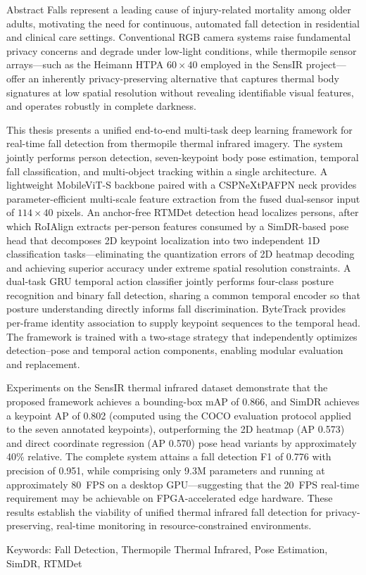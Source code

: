 \vspace*{0pt plus 1fill}
\begin{tucsimplesection}{Abstract}
Falls represent a leading cause of injury-related mortality among older adults, motivating the
need for continuous, automated fall detection in residential and clinical care settings.
Conventional RGB camera systems raise fundamental privacy concerns and degrade under low-light
conditions, while thermopile sensor arrays---such as the Heimann HTPA $60\times40$ employed in
the SensIR project---offer an inherently privacy-preserving alternative that captures thermal
body signatures at low spatial resolution without revealing identifiable visual features, and
operates robustly in complete darkness.

This thesis presents a unified end-to-end multi-task deep learning
framework for real-time fall detection from thermopile thermal infrared imagery. The system
jointly performs person detection, seven-keypoint body pose estimation, temporal fall
classification, and multi-object tracking within a single architecture. A lightweight
MobileViT-S backbone paired with a CSPNeXtPAFPN neck provides
parameter-efficient multi-scale feature extraction from the fused dual-sensor input of
$114\times40$ pixels. An anchor-free RTMDet detection head localizes
persons, after which RoIAlign extracts per-person features consumed by a
SimDR-based pose head that decomposes 2D keypoint localization into two independent 1D
classification tasks---eliminating the quantization errors of 2D heatmap decoding and achieving
superior accuracy under extreme spatial resolution constraints. A dual-task GRU temporal
action classifier jointly performs four-class posture recognition and binary fall detection,
sharing a common temporal encoder so that posture understanding directly informs fall
discrimination. ByteTrack provides per-frame identity association to supply
keypoint sequences to the temporal head. The framework is trained with a two-stage
strategy that independently optimizes detection--pose and temporal action components, enabling
modular evaluation and replacement.

Experiments on the SensIR thermal infrared dataset demonstrate that the proposed framework
achieves a bounding-box mAP of 0.866, and SimDR achieves a keypoint
AP of 0.802 (computed using the COCO evaluation protocol applied to the seven annotated
keypoints), outperforming the 2D heatmap (AP 0.573) and direct coordinate regression (AP 0.570) pose head variants by
approximately 40\% relative. The complete system attains a fall detection F1 of 0.776 with precision of 0.951,
while comprising only 9.3M parameters and running at approximately 80~FPS on a
desktop GPU---suggesting that the 20~FPS real-time requirement may be achievable on FPGA-accelerated edge hardware. These results establish the
viability of unified thermal infrared fall detection for privacy-preserving, real-time monitoring
in resource-constrained environments.

\medskip
\noindent Keywords: Fall Detection, Thermopile Thermal Infrared, Pose Estimation, SimDR, RTMDet
\end{tucsimplesection}
\vspace*{0pt plus 2.5fill}
